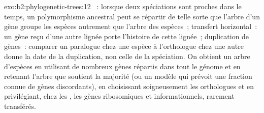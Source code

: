 \begin{solution}{exo:b2:phylogenetic-trees:12}
~: lorsque deux spéciations sont proches dans le
temps, un polymorphisme ancestral peut se répartir de telle sorte que
l'arbre d'un gène groupe les espèces autrement que l'arbre des espèces~;
transfert horizontal~: un gène reçu d'une autre lignée porte l'histoire de
cette lignée~; duplication de gènes~: comparer un paralogue chez une
espèce à l'orthologue chez une autre donne la date de la duplication, non
celle de la spéciation. On obtient un arbre d'espèces en utilisant de
nombreux gènes répartis dans tout le génome et en retenant l'arbre que
soutient la majorité (ou un modèle qui prévoit une fraction connue de
gènes discordants), en choisissant soigneusement les orthologues et en
privilégiant, chez les , les gènes ribosomiques et
informationnels, rarement transférés.
\end{solution}

